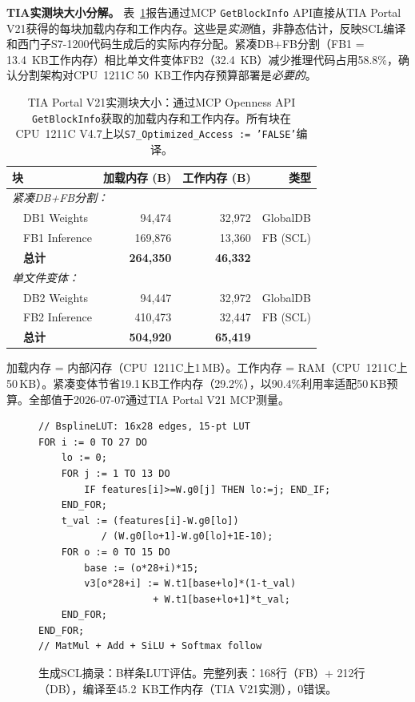 \documentclass[journal,onecolumn]{IEEEtran}
\theoremstyle{definition}
\theoremstyle{plain}
\theoremstyle{remark}
\begin{document}
\vspace{4pt}
\noindent\textbf{TIA实测块大小分解。}
表~\ref{tab:tia_blocks}报告通过MCP \texttt{GetBlockInfo} API直接从TIA Portal V21获得的每块加载内存和工作内存。这些是\textit{实测}值，非静态估计，反映SCL编译和西门子S7-1200代码生成后的实际内存分配。紧凑DB+FB分割（FB1 = 13.4~KB工作内存）相比单文件变体FB2（32.4~KB）减少推理代码占用58.8\%，确认分割架构对CPU~1211C 50~KB工作内存预算部署是\textit{必要的}。

\begin{table}[!tb]
\centering
\caption{TIA Portal V21实测块大小：通过MCP Openness API \texttt{GetBlockInfo}获取的加载内存和工作内存。所有块在CPU~1211C V4.7上以\texttt{S7\_Optimized\_Access := 'FALSE'}编译。}
\label{tab:tia_blocks}
\footnotesize
\begin{tabular}{@{}lrrr@{}}
\toprule
\textbf{块} & \textbf{加载内存 (B)} & \textbf{工作内存 (B)} & \textbf{类型} \\
\midrule
\multicolumn{4}{l}{\textit{紧凑DB+FB分割：}} \\
~~DB1 Weights  & 94{,}474 & 32{,}972 & GlobalDB \\
~~FB1 Inference & 169{,}876 & 13{,}360 & FB (SCL) \\
~~\textbf{总计}     & \textbf{264{,}350} & \textbf{46{,}332} & \\
\midrule
\multicolumn{4}{l}{\textit{单文件变体：}} \\
~~DB2 Weights  & 94{,}447 & 32{,}972 & GlobalDB \\
~~FB2 Inference & 410{,}473 & 32{,}447 & FB (SCL) \\
~~\textbf{总计}     & \textbf{504{,}920} & \textbf{65{,}419} & \\
\bottomrule
\end{tabular}
\vspace{2pt}
{\scriptsize 加载内存 = 内部闪存（CPU~1211C上1\,MB）。工作内存 = RAM（CPU~1211C上50\,KB）。紧凑变体节省19.1\,KB工作内存（29.2\%），以90.4\%利用率适配50\,KB预算。全部值于2026-07-07通过TIA Portal V21 MCP测量。}
\end{table}

\begin{figure}[!t]
\scriptsize
\begin{verbatim}
// BsplineLUT: 16x28 edges, 15-pt LUT
FOR i := 0 TO 27 DO
    lo := 0;
    FOR j := 1 TO 13 DO
        IF features[i]>=W.g0[j] THEN lo:=j; END_IF;
    END_FOR;
    t_val := (features[i]-W.g0[lo])
           / (W.g0[lo+1]-W.g0[lo]+1E-10);
    FOR o := 0 TO 15 DO
        base := (o*28+i)*15;
        v3[o*28+i] := W.t1[base+lo]*(1-t_val)
                    + W.t1[base+lo+1]*t_val;
    END_FOR;
END_FOR;
// MatMul + Add + SiLU + Softmax follow
\end{verbatim}
\caption{生成SCL摘录：B样条LUT评估。完整列表：168行（FB）+ 212行（DB），编译至45.2~KB工作内存（TIA V21实测），0错误。}
\label{fig:scl_snippet}
\end{figure}
\end{document}
